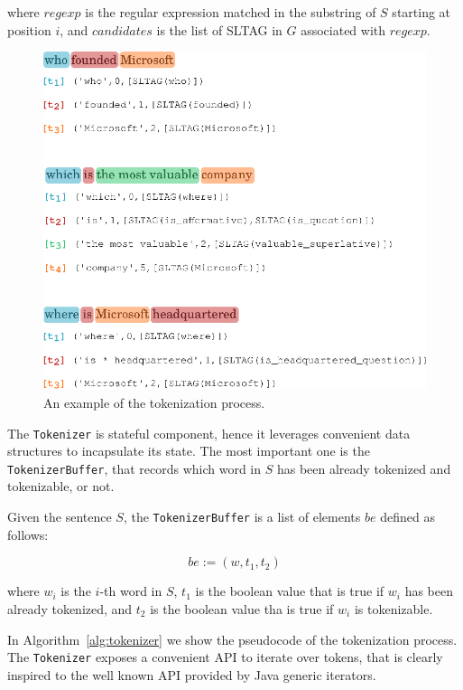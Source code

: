 where
$regexp$ is the regular expression matched in the substring of $S$ starting at position $i$, and
$candidates$ is the list of SLTAG in $G$ associated with $regexp$.

\begin{figure}[tp]
	\centering
	\includegraphics[width=0.8\columnwidth]{./fig/tokenizer-sample}
	\caption{An example of the tokenization process.}
	\label{fig:tokenizer-sample}
\end{figure}

The \texttt{Tokenizer} is stateful component, hence it leverages convenient data structures to incapsulate its state.
%
The most important one is the \texttt{TokenizerBuffer}, that records which word in $S$ has been already tokenized and tokenizable, or not.

Given the sentence $S$, the \texttt{TokenizerBuffer} is a list of elements $be$ defined as follows:

\begin{equation}
\label{eqn:tokenizer-buffer-element}
	be:=(w, t_{1}, t_{2})
\end{equation}

where 
$w_{i}$ is the $i$-th word in $S$, 
$t_{1}$ is the boolean value that is true if $w_{i}$ has been already tokenized, and
$t_{2}$ is the boolean value tha is true if $w_{i}$ is tokenizable.


In Algorithm~\ref{alg:tokenizer} we show the pseudocode of the tokenization process.
%
The \texttt{Tokenizer} exposes a convenient API to iterate over tokens, that is clearly inspired to the well known API provided by Java generic iterators.

